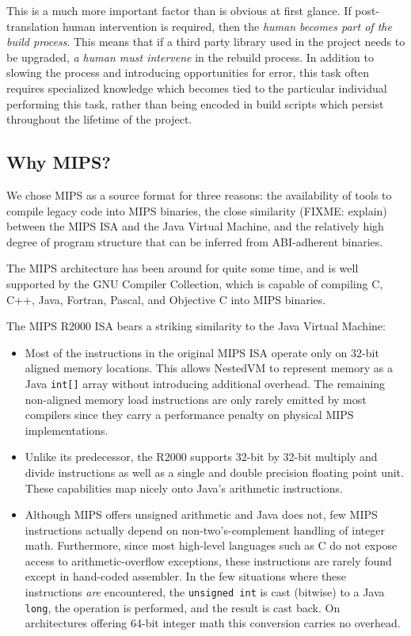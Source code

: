 \documentclass{acmconf}
\begin{document}
This is a much more important factor than is obvious at first glance.
If post-translation human intervention is required, then the {\it
human becomes part of the build process}.  This means that if a third
party library used in the project needs to be upgraded, {\it a human
must intervene} in the rebuild process.  In addition to slowing the
process and introducing opportunities for error, this task often
requires specialized knowledge which becomes tied to the particular
individual performing this task, rather than being encoded in build
scripts which persist throughout the lifetime of the project.

\subsection{Why MIPS?}

We chose MIPS as a source format for three reasons: the availability
of tools to compile legacy code into MIPS binaries, the close
similarity (FIXME: explain) between the MIPS ISA and the Java Virtual
Machine, and the relatively high degree of program structure that can
be inferred from ABI-adherent binaries.

The MIPS architecture has been around for quite some time, and is well
supported by the GNU Compiler Collection, which is capable of
compiling C, C++, Java, Fortran, Pascal, and Objective C
into MIPS binaries.

The MIPS R2000 ISA bears a striking similarity to the Java Virtual
Machine:

\begin{itemize}

\item Most of the instructions in the original MIPS ISA operate only
      on 32-bit aligned memory locations. This allows NestedVM to
      represent memory as a Java {\tt int[]} array without introducing
      additional overhead.  The remaining non-aligned memory load
      instructions are only rarely emitted by most compilers since
      they carry a performance penalty on physical MIPS
      implementations.

\item Unlike its predecessor, the R2000 supports 32-bit by 32-bit
      multiply and divide instructions as well as a single and double
      precision floating point unit.  These capabilities map nicely
      onto Java's arithmetic instructions.

\item Although MIPS offers unsigned arithmetic and Java does not, few
      MIPS instructions actually depend on non-two's-complement
      handling of integer math.  Furthermore, since most high-level
      languages such as C do not expose access to arithmetic-overflow
      exceptions, these instructions are rarely found except in
      hand-coded assembler.  In the few situations where these
      instructions {\it are} encountered, the {\tt unsigned int} is
      cast (bitwise) to a Java {\tt long}, the operation is performed,
      and the result is cast back.  On architectures offering 64-bit
      integer math this conversion carries no overhead.
      
\end{itemize}
\end{document}
